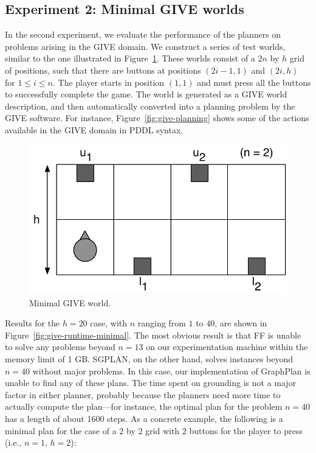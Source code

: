 \subsection{Experiment 2: Minimal GIVE worlds}
\label{sec:exper-2:-minim}

In the second experiment, we evaluate the performance of the planners on
problems arising in the GIVE domain. We construct a series of test worlds,
similar to the one illustrated in Figure~\ref{fig:give-minimal}. These
worlds consist of a $2n$ by $h$ grid of positions, such that there are
buttons at positions $(2i-1,1)$ and $(2i,h)$ for $1 \leq i \leq n$. The
player starts in position $(1,1)$ and must press all the buttons
to successfully complete the game. The world is generated as a GIVE world
description, and then automatically converted into a planning problem by
the GIVE software. For instance, Figure~\ref{fig:give-planning} shows some
of the actions available in the GIVE domain in PDDL syntax.

\begin{figure}[t]
  \centering
  \includegraphics[width=0.5\columnwidth]{pic-buttons}
  \caption{Minimal GIVE world.}
  \label{fig:give-minimal}
\end{figure}

Results for the $h=20$ case, with $n$ ranging from $1$ to $40$, are shown
in Figure~\ref{fig:give-runtime-minimal}. The most obvious result is that
FF is unable to solve any problems beyond $n=13$ on our experimentation
machine within the memory limit of 1 GB. SGPLAN, on the other hand, solves
instances beyond $n=40$ without major problems. In this case, our
implementation of GraphPlan is unable to find any of these plans. The time
spent on grounding is not a major factor in either planner, probably
because the planners need more time to actually compute the plan---for
instance, the optimal plan for the problem $n=40$ has a length of about
1600 steps. As a concrete example, the following is a minimal plan for the
case of a $2$ by $2$ grid with $2$ buttons for the player to press (i.e.,
$n=1$, $h=2$):

